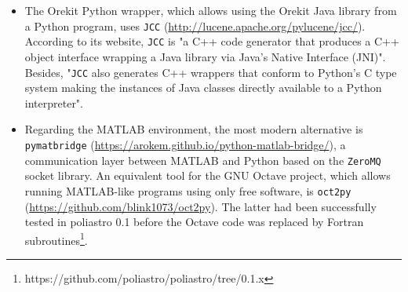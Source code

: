 \begin{itemize}
\item The Orekit Python wrapper, which allows using the Orekit Java library from a Python program, uses \verb|JCC|  (\url{http://lucene.apache.org/pylucene/jcc/}). According to its website, \verb|JCC| is "a C++ code generator that produces a C++ object interface wrapping a Java library via Java's Native Interface (JNI)". Besides, "\verb|JCC| also generates C++ wrappers that conform to Python's C type system making the instances of Java classes directly available to a Python interpreter".
\item Regarding the MATLAB environment, the most modern alternative is \verb|pymatbridge| (\url{https://arokem.github.io/python-matlab-bridge/}), a communication layer between MATLAB and Python based on the \verb|ZeroMQ| socket library\cite{hintjens2013zeromq}. An equivalent tool for the GNU Octave project\cite{eaton1997gnu}, which allows running MATLAB-like programs using only free software, is \verb|oct2py| (\url{https://github.com/blink1073/oct2py}). The latter had been successfully tested in poliastro 0.1 before the Octave code was replaced by Fortran subroutines\footnote{https://github.com/poliastro/poliastro/tree/0.1.x}.
\end{itemize}